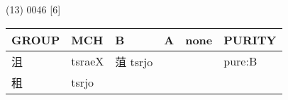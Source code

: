 \documentclass[14pt,a4paper]{scrartcl}
\begin{document}
(13) 0046 {[}6{]}

\begin{longtable}[c]{@{}llllll@{}}
\toprule
\begin{minipage}[b]{0.14\columnwidth}\raggedright\strut
GROUP
\strut\end{minipage} &
\begin{minipage}[b]{0.14\columnwidth}\raggedright\strut
MCH
\strut\end{minipage} &
\begin{minipage}[b]{0.14\columnwidth}\raggedright\strut
B
\strut\end{minipage} &
\begin{minipage}[b]{0.14\columnwidth}\raggedright\strut
A
\strut\end{minipage} &
\begin{minipage}[b]{0.14\columnwidth}\raggedright\strut
none
\strut\end{minipage} &
\begin{minipage}[b]{0.14\columnwidth}\raggedright\strut
PURITY
\strut\end{minipage}\tabularnewline
\midrule
\endhead
\begin{minipage}[t]{0.14\columnwidth}\raggedright\strut
沮
\strut\end{minipage} &
\begin{minipage}[t]{0.14\columnwidth}\raggedright\strut
tsraeX
\strut\end{minipage} &
\begin{minipage}[t]{0.14\columnwidth}\raggedright\strut
菹 tsrjo
\strut\end{minipage} &
\begin{minipage}[t]{0.14\columnwidth}\raggedright\strut
\strut\end{minipage} &
\begin{minipage}[t]{0.14\columnwidth}\raggedright\strut
\strut\end{minipage} &
\begin{minipage}[t]{0.14\columnwidth}\raggedright\strut
pure:B
\strut\end{minipage}\tabularnewline
\begin{minipage}[t]{0.14\columnwidth}\raggedright\strut
租
\strut\end{minipage} &
\begin{minipage}[t]{0.14\columnwidth}\raggedright\strut
tsrjo
\strut\end{minipage} &
\begin{minipage}[t]{0.14\columnwidth}\raggedright\strut
\strut\end{minipage} &

\end{longtable}
\end{document}
